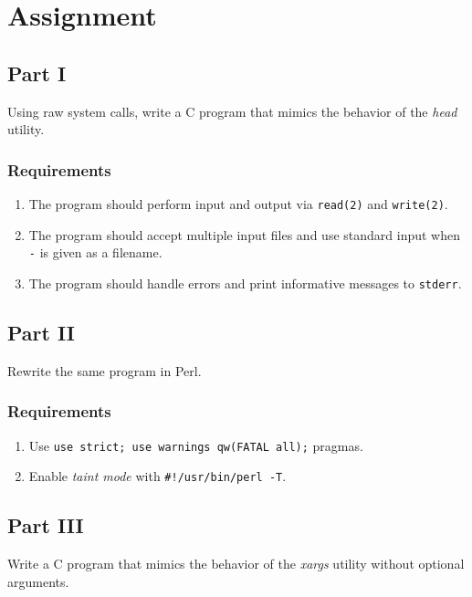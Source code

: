 \documentclass[en, listings]{labreport}
\begin{document}
\maketitlepage

\section*{Assignment}

\subsection*{Part I}

Using raw system calls, write a C program that mimics the behavior of the \textit{head} utility.

\subsubsection*{Requirements}

\begin{enumerate}
\item The program should perform input and output via \verb|read(2)| and \verb|write(2)|.
\item The program should accept multiple input files and use standard input when \texttt{-} is given as a filename.
\item The program should handle errors and print informative messages to \verb|stderr|.
\end{enumerate}

\subsection*{Part II}

Rewrite the same program in Perl.

\subsubsection*{Requirements}

\begin{enumerate}
\item Use \verb|use strict; use warnings qw(FATAL all);| pragmas.
\item Enable \textit{taint mode} with \verb|#!/usr/bin/perl -T|.
\end{enumerate}

\subsection*{Part III}

Write a C program that mimics the behavior of the \textit{xargs}
utility without optional arguments.
\end{document}
